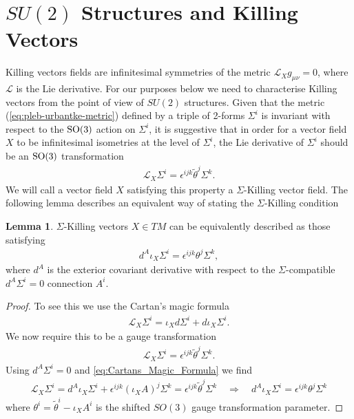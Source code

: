 \documentclass[10pt]{report}
\theoremstyle{definition}
\newtheorem{lemma}{Lemma}[chapter]
\begin{document}
\section{$SU(2)$ Structures and Killing Vectors}\label{sec:SU2_Killing_Vectors}

Killing vectors fields are infinitesimal symmetries of the metric $\mathcal{L}_X g_{\mu \nu} = 0$, where $\mathcal{L}$ is the Lie derivative. For our purposes below we need to characterise Killing vectors from the point of view of $SU(2)$ structures. Given that the metric (\ref{eq:pleb-urbantke-metric}) defined by a triple of 2-forms $\Sigma^i$ is invariant with respect to the ${\rm SO}(3)$ action on $\Sigma^i$, it is suggestive that in order for a vector field $X$ to be infinitesimal isometries at the level of $\Sigma^i$, the Lie derivative of $\Sigma^i$ should be an ${\rm SO}(3)$ transformation
 \begin{align}\label{def:KillingVectorDef}
        \mathcal{L}_X \Sigma^i = \epsilon^{ijk} \tilde{\theta}^j \Sigma^k.
    \end{align}
We will call a vector field $X$ satisfying this property a $\Sigma$-Killing vector field. The following lemma describes an equivalent way of stating the $\Sigma$-Killing condition
\begin{lemma}
    $\Sigma$-Killing vectors $X \in TM$ can be equivalently described as those satisfying 
    \begin{align}
       d^A \iota_X \Sigma^i = \epsilon^{ijk} \theta^j \Sigma^k,
    \end{align}
    where $d^A$ is the exterior covariant derivative with respect to the $\Sigma$-compatible $d^A \Sigma^i=0$ connection $A^i$. 
    \end{lemma}
\begin{proof}
    To see this we use the Cartan's magic formula
    \begin{align}
        \mathcal{L}_X \Sigma^i = \iota_X d\Sigma^i + d \iota_X \Sigma^i.\label{eq:Cartans_Magic_Formula}
    \end{align}
   We now require this to be a gauge transformation    
       \begin{align}
        \mathcal{L}_X \Sigma^i = \epsilon^{ijk} \tilde{\theta}^j \Sigma^k \label{eq:SU2_LieD_KillingEqn}.
    \end{align}
    Using $d^A \Sigma^i = 0$ and \cref{eq:Cartans_Magic_Formula} we find 
    \begin{align}
        \mathcal{L}_X \Sigma^i = d^A \iota_X \Sigma^i + \epsilon^{ijk} {(\iota_X A)}^j \Sigma^k = \epsilon^{ijk} \tilde{\theta}^j \Sigma^k  \quad \Rightarrow \quad d^A \iota_X \Sigma^i = \epsilon^{ijk} \theta^j \Sigma^k
    \end{align}
    where $\theta^i = \tilde{\theta}^i - \iota_X A^i$ is the shifted $SO(3)$ gauge transformation parameter.
\end{proof}
\end{document}
